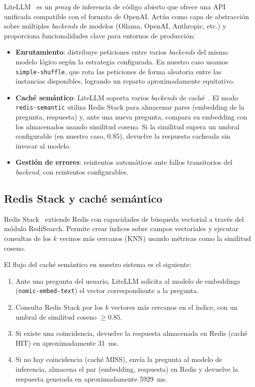 LiteLLM~\cite{litellm} es un \textit{proxy} de inferencia de código abierto que ofrece una API unificada compatible con el formato de OpenAI. Actúa como capa de abstracción sobre múltiples \textit{backends} de modelos (Ollama, OpenAI, Anthropic, etc.) y proporciona funcionalidades clave para entornos de producción:

\begin{itemize}
    \item \textbf{Enrutamiento}: distribuye peticiones entre varios \textit{backends} del mismo modelo lógico según la estrategia configurada. En nuestro caso usamos \texttt{simple-shuffle}, que rota las peticiones de forma aleatoria entre las instancias disponibles, logrando un reparto aproximadamente equitativo.
    
    \item \textbf{Caché semántico}: LiteLLM soporta varios \textit{backends} de caché~\cite{litellmSemanticCache}. El modo \texttt{redis-semantic} utiliza Redis Stack para almacenar pares (embedding de la pregunta, respuesta) y, ante una nueva pregunta, compara su embedding con los almacenados usando similitud coseno. Si la similitud supera un umbral configurable (en nuestro caso, 0.85), devuelve la respuesta cacheada sin invocar al modelo.
    
    \item \textbf{Gestión de errores}: reintentos automáticos ante fallos transitorios del \textit{backend}, con reintentos configurables.
\end{itemize}

\subsection{Redis Stack y caché semántico}

Redis Stack~\cite{redisStack} extiende Redis con capacidades de búsqueda vectorial a través del módulo RediSearch. Permite crear índices sobre campos vectoriales y ejecutar consultas de los $k$ vecinos más cercanos (KNN) usando métricas como la similitud coseno.

El flujo del caché semántico en nuestro sistema es el siguiente:

\begin{enumerate}
    \item Ante una pregunta del usuario, LiteLLM solicita al modelo de embeddings (\texttt{nomic-embed-text}) el vector correspondiente a la pregunta.
    \item Consulta Redis Stack por los $k$ vectores más cercanos en el índice, con un umbral de similitud coseno $\ge 0.85$.
    \item Si existe una coincidencia, devuelve la respuesta almacenada en Redis (caché HIT) en aproximadamente 31~ms.
    \item Si no hay coincidencia (caché MISS), envía la pregunta al modelo de inferencia, almacena el par (embedding, respuesta) en Redis y devuelve la respuesta generada en aproximadamente 5929~ms.
\end{enumerate}

